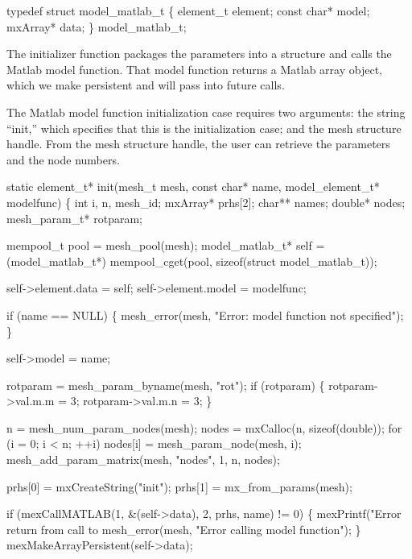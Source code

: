 \nwenddocs{}\endmoddef
typedef struct model_matlab_t \{
    element_t   element;
    const char* model;
    mxArray*    data;
\} model_matlab_t;

\nwendcode{}\nwdocspar

The initializer function packages the parameters into a structure
and calls the Matlab model function.  That model function returns
a Matlab array object, which we make persistent and will pass
into future calls.

The Matlab model function initialization case requires two arguments:
the string ``init,'' which specifies that this is the initialization case;
and the mesh structure handle.  From the mesh structure handle, the
user can retrieve the parameters and the node numbers.

\nwenddocs{}\endmoddef
static element_t* init(mesh_t mesh, const char* name,
                       model_element_t* modelfunc)
\{
    int i, n, mesh_id;
    mxArray* prhs[2];
    char** names;
    double* nodes;
    mesh_param_t* rotparam;

    mempool_t       pool = mesh_pool(mesh);
    model_matlab_t* self = (model_matlab_t*)
        mempool_cget(pool, sizeof(struct model_matlab_t));

    self->element.data = self;
    self->element.model = modelfunc;

    if (name == NULL) \{
        mesh_error(mesh, "Error: model function not specified");
    \}

    self->model = name;

    rotparam = mesh_param_byname(mesh, "rot");
    if (rotparam) \{
        rotparam->val.m.m = 3;
        rotparam->val.m.n = 3;
    \}

    n = mesh_num_param_nodes(mesh);
    nodes = mxCalloc(n, sizeof(double));
    for (i = 0; i < n; ++i)
        nodes[i] = mesh_param_node(mesh, i);
    mesh_add_param_matrix(mesh, "nodes", 1, n, nodes);

    prhs[0] = mxCreateString("init");
    prhs[1] = mx_from_params(mesh);

    if (mexCallMATLAB(1, &(self->data), 2, prhs, name) != 0) \{
        mexPrintf("Error return from call to %
        mesh_error(mesh, "Error calling model function");
    \}
    mexMakeArrayPersistent(self->data);

